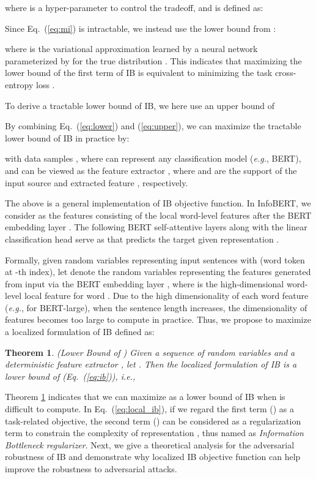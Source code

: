 \documentclass{article} \usepackage{iclr2021_conference,times}
\newtheorem{theorem}{Theorem}[section]
\theoremstyle{definition}
\theoremstyle{remark}
\newcommand{\method}{InfoBERT\xspace}
\newcommand{\modified}[1]{{\color{black}{#1}}}
\begin{document}
where  is a hyper-parameter to control the tradeoff, and   is defined as: 

Since Eq.~(\ref{eq:mi}) is intractable, we instead use the lower bound from \citet{Barber2003TheIA}: 

where   is the variational approximation learned by a neural network parameterized by  for the true distribution . This indicates that maximizing the lower bound of the first term of IB  is equivalent to minimizing the task cross-entropy loss . 

To derive a tractable lower bound of IB, we here use an upper bound \citep{Cheng2020CLUBAC} of  

By combining Eq.~(\ref{eq:lower}) and (\ref{eq:upper}), we can maximize the tractable lower bound  of IB in practice by:

with data samples , where    can represent any classification model (\emph{e.g.}, BERT), and    can be viewed as the feature extractor , where  and  are the support of the input source  and extracted feature , respectively.

The above is a general implementation of IB objective function. In \method, we consider  as the features consisting of the local word-level features after the BERT embedding layer . The following BERT self-attentive layers along with the linear classification head serve as   that predicts the target  given representation . 

Formally, given random variables   representing input sentences with  (word token at -th index), let  denote the random variables representing the features generated from input  via the BERT embedding layer , where  is the high-dimensional word-level local feature for word . Due to the high dimensionality  of each word feature (\emph{e.g.},  for BERT-large), when the sentence length  increases, the dimensionality of features  becomes too large to compute  in practice. Thus, we propose to maximize a localized formulation of IB  defined as:

\begin{theorem} (Lower Bound of ) Given a sequence of random variables  and a deterministic feature extractor , let . Then the localized formulation of IB  is a lower bound of  (Eq.~(\ref{eq:ib})), i.e.,
\label{thm:local}

\end{theorem} Theorem \ref{thm:local} indicates that we can maximize \modified{the localized formulation of}  as a lower bound of IB  when  is difficult to compute. In Eq.~(\ref{eq:local_ib}), if we regard the first term () as a task-related objective, the second term () can be considered as a regularization term to constrain the complexity of representation , thus named as \textit{Information Bottleneck regularizer}.  Next, we give a theoretical analysis for the adversarial robustness of IB and demonstrate why localized IB objective function can help improve the robustness to adversarial attacks. 
\end{document}
